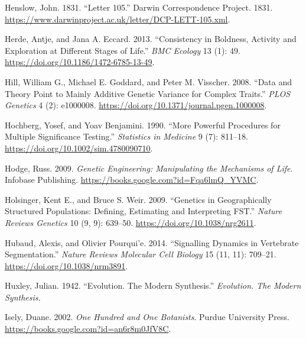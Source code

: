 \documentclass[
]{book}
\newlength{\cslhangindent}
\newlength{\cslentryspacingunit} %
\newenvironment{CSLReferences}[2] %
 {%
  \setlength{\parindent}{0pt}
  \ifodd #1
  \let\oldpar\par
  \def\par{\hangindent=\cslhangindent\oldpar}
  \fi
  \setlength{\parskip}{#2\cslentryspacingunit}
 }%
 {}
\begin{document}
\begin{CSLReferences}{1}{0}
\leavevmode{}%
Henslow, John. 1831. {``Letter 105.''} {Darwin Correspondence Project}. 1831. \url{https://www.darwinproject.ac.uk/letter/DCP-LETT-105.xml}.

\leavevmode{}%
Herde, Antje, and Jana A. Eccard. 2013. {``Consistency in Boldness, Activity and Exploration at Different Stages of Life.''} \emph{BMC Ecology} 13 (1): 49. \url{https://doi.org/10.1186/1472-6785-13-49}.

\leavevmode{}%
Hill, William G., Michael E. Goddard, and Peter M. Visscher. 2008. {``Data and {Theory Point} to {Mainly Additive Genetic Variance} for {Complex Traits}.''} \emph{PLOS Genetics} 4 (2): e1000008. \url{https://doi.org/10.1371/journal.pgen.1000008}.

\leavevmode{}%
Hochberg, Yosef, and Yoav Benjamini. 1990. {``More Powerful Procedures for Multiple Significance Testing.''} \emph{Statistics in Medicine} 9 (7): 811--18. \url{https://doi.org/10.1002/sim.4780090710}.

\leavevmode{}%
Hodge, Russ. 2009. \emph{Genetic {Engineering}: {Manipulating} the {Mechanisms} of {Life}}. {Infobase Publishing}. \url{https://books.google.com?id=Fqa6lmQ_YVMC}.

\leavevmode{}%
Holsinger, Kent E., and Bruce S. Weir. 2009. {``Genetics in Geographically Structured Populations: Defining, Estimating and Interpreting {FST}.''} \emph{Nature Reviews Genetics} 10 (9, 9): 639--50. \url{https://doi.org/10.1038/nrg2611}.

\leavevmode{}%
Hubaud, Alexis, and Olivier Pourqui'e. 2014. {``Signalling Dynamics in Vertebrate Segmentation.''} \emph{Nature Reviews Molecular Cell Biology} 15 (11, 11): 709--21. \url{https://doi.org/10.1038/nrm3891}.

\leavevmode{}%
Huxley, Julian. 1942. {``Evolution. {The} Modern Synthesis.''} \emph{Evolution. The Modern Synthesis.}

\leavevmode{}%
Isely, Duane. 2002. \emph{One {Hundred} and {One Botanists}}. {Purdue University Press}. \url{https://books.google.com?id=an6r8m0JfV8C}.


\end{CSLReferences}
\end{document}
